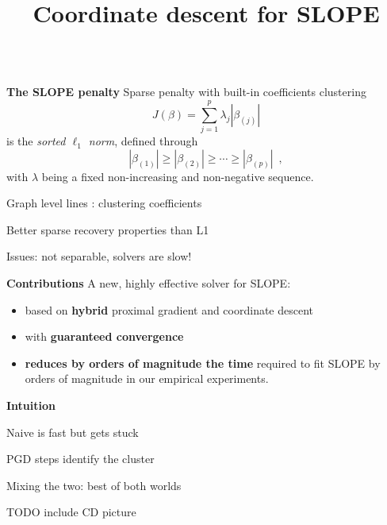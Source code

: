 \documentclass[english,final,t]{beamer}
\title{
	Coordinate descent for SLOPE}
\author{%
\texorpdfstring{
	\begin{minipage}{.7\linewidth}
	\begin{columns}%
		\column{.3\linewidth}
		\centering
		\Large Johan Larsson \\
		\large Mila \& Université de Montréal
		\column{.3\linewidth}
		\centering
		\Large Quentin Klopfenstein \\
		\large Université du Luxembourg
		\column{.28\linewidth}
		\centering
		\Large Mathurin Massias \\
		\large Univ. Lyon, Inria, CNRS, ENS de Lyon
		\centering
		\Large Jonas Wallin \\
		\large Univ. Lyon, Inria, CNRS, ENS de Lyon
	\end{columns}
	\vspace{1em}
\end{minipage}}{}
}
\begin{document}
\begin{frame}{}
\begin{columns}[t]
	\begin{column}{.3\linewidth}
		\begin{block}{\textbf{\color{malgared} The SLOPE penalty}}
			\justifying
			Sparse penalty with built-in coefficients clustering
	\begin{equation*}
		J(\beta) = \sum_{j=1}^p \lambda_j|\beta_{(j)}|
    \end{equation*}
    is the \emph{sorted \(\ell_1\) norm}, defined through
\begin{equation}
  |\beta_{(1)}| \geq |\beta_{(2)}| \geq \cdots \geq |\beta_{(p)}| \enspace,
\end{equation}
with \(\lambda\) being a fixed non-increasing and non-negative sequence.

Graph level lines : clustering coefficients

Better sparse recovery properties than L1

Issues: not separable, solvers are slow!

	\end{block}
	\begin{block}{\textbf{\color{malgared} Contributions}}
			A new, highly effective solver for SLOPE:
			\vspace{1em}
			\begin{itemize}
				\item  based on \textbf{\color{malgared}hybrid} proximal gradient and coordinate descent
				\item  with \textbf{\color{malgared}guaranteed convergence}
				\item  \textbf{\color{malgared}reduces by orders of magnitude the time}
				required to fit SLOPE by orders of magnitude in our empirical experiments.
			\end{itemize}
	\end{block}

	\begin{block}{\textbf{\color{malgared} Intuition}}

	Naive is fast but gets stuck

	PGD steps identify the cluster

	Mixing the two: best of both worlds

	TODO include CD picture


\end{block}
\end{column}
\end{columns}
\end{frame}
\end{document}
